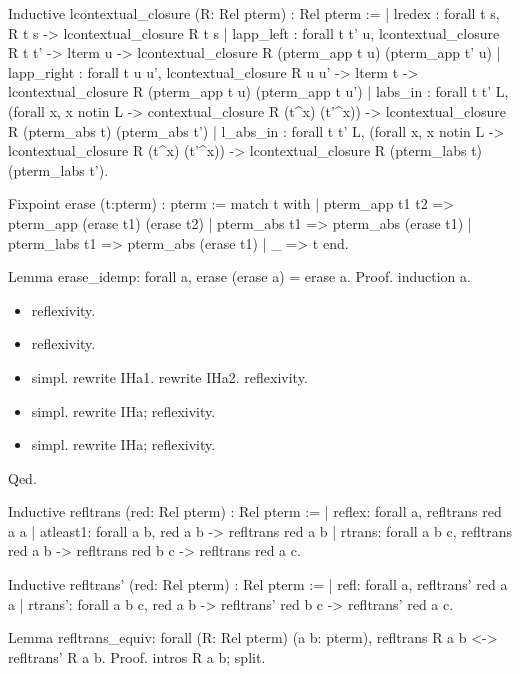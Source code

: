 Inductive lcontextual\_closure (R: Rel pterm) : Rel pterm :=
  | lredex : forall t s, R t s -> lcontextual\_closure R t s
  | lapp\_left : forall t t' u, lcontextual\_closure R t t' -> lterm u ->
	  		      lcontextual\_closure R (pterm\_app t u) (pterm\_app t' u)
  | lapp\_right : forall t u u', lcontextual\_closure R u u' -> lterm t ->
	  		       lcontextual\_closure R (pterm\_app t u) (pterm\_app t u')
  | labs\_in : forall t t' L, (forall x, x notin L -> contextual\_closure R (t\^{}x) (t'\^{}x)) ->
                               lcontextual\_closure R (pterm\_abs t) (pterm\_abs t')
  | l\_abs\_in : forall t t' L, (forall x, x notin L -> lcontextual\_closure R (t\^{}x) (t'\^{}x)) ->
                               lcontextual\_closure R (pterm\_labs t) (pterm\_labs t').


Fixpoint erase (t:pterm) : pterm :=
  match t with
  | pterm\_app t1 t2 => pterm\_app (erase t1) (erase t2)
  | pterm\_abs t1 => pterm\_abs (erase t1)
  | pterm\_labs t1 => pterm\_abs (erase t1)
  | \_ => t
  end.




Lemma erase\_idemp: forall a, erase (erase a) = erase a.
Proof.
  induction a.

\begin{itemize}
\item  reflexivity.

\item  reflexivity.

\item  simpl.
    rewrite IHa1.
    rewrite IHa2.
    reflexivity.

\item  simpl.
    rewrite IHa; reflexivity.

\item  simpl.
    rewrite IHa; reflexivity.

\end{itemize}
Qed.


Inductive refltrans (red: Rel pterm) : Rel pterm :=
| reflex: forall a, refltrans red a a
| atleast1: forall a b, red a b -> refltrans red a b
| rtrans: forall a b c, refltrans red a b -> refltrans red b c -> refltrans red a c.


Inductive refltrans' (red: Rel pterm) : Rel pterm :=
| refl: forall a, refltrans' red a a
| rtrans': forall a b c, red a b -> refltrans' red b c -> refltrans' red a c.


Lemma refltrans\_equiv: forall (R: Rel pterm) (a b: pterm), refltrans R a b <-> refltrans' R a b.
Proof.
  intros R a b; split.

